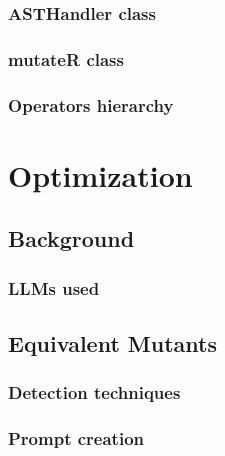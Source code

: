 
\subsection{ASTHandler class}


\subsection{mutateR class}


\subsection{Operators hierarchy}



\chapter{Optimization}

\begin{chapterabstract}
\end{chapterabstract}

\section{Background}

\subsection{LLMs used}

\section{Equivalent Mutants}

\subsection{Detection techniques}

\subsection{Prompt creation}

